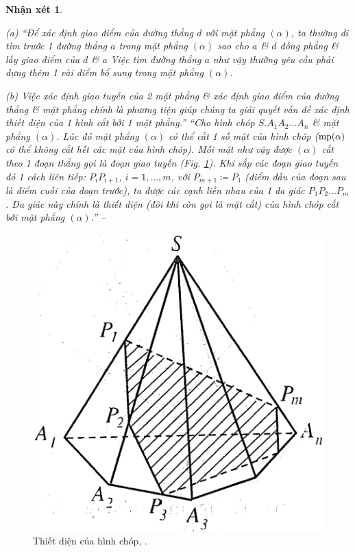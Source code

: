 \documentclass[oneside]{book}
\numberwithin{equation}{section}
\newtheorem{nhanxet}{Nhận xét}[section]
\begin{document}
\begin{nhanxet}
	\begin{enumerate*}
		\item[(a)] ``Để xác định giao điểm của đường thẳng $d$ với mặt phẳng $(\alpha)$, ta thường đi tìm trước 1 đường thẳng $a$ trong mặt phẳng $(\alpha)$ sao cho $a$ \& $d$ đồng phẳng \& lấy giao điểm của $d$ \& $a$ Việc tìm đường thẳng $a$ như vậy thường yêu cầu phải dựng thêm 1 vài điểm bổ sung trong mặt phẳng $(\alpha)$.
		\item[(b)] Việc xác định giao tuyến của 2 mặt phẳng \& xác định giao điểm của đường thẳng \& mặt phẳng chính là phương tiện giúp chúng ta giải quyết vấn đề xác định thiết diện của 1 hình cắt bởi 1 mặt phẳng.'' ``Cho hình chóp $S.A_1A_2\ldots A_n$ \& mặt phẳng $(\alpha)$. Lúc đó mặt phẳng $(\alpha)$ có thể cắt 1 số mặt của hình chóp (${\rm mp}(\alpha)$ có thể không cắt hết các mặt của hình chóp). Mỗi mặt như vậy được $(\alpha)$ cắt theo 1 đoạn thẳng gọi là \emph{đoạn giao tuyến} (Fig. \ref{fig:thiet_dien_hinh_chop}). Khi sắp các đoạn giao tuyến đó 1 cách liên tiếp: $P_iP_{i+1}$, $i = 1,\ldots,m$, với $P_{m+1}\coloneqq P_1$ (điểm đầu của đoạn sau là điểm cuối của đoạn trước), ta được các cạnh liền nhau của 1 đa giác $P_1P_2\ldots P_m$. Đa giác này chính là \emph{thiết diện} (đôi khi còn gọi là \emph{mặt cắt}) của hình chóp cắt bởi mặt phẳng $(\alpha)$.'' -- \cite[pp. 53--54]{TL_chuyen_Toan_Hinh_Hoc_11}
	\end{enumerate*}
\end{nhanxet}

\begin{figure}[H]
	\centering
	\includegraphics[scale=0.13]{thiet_dien_hinh_chop}
	\caption{Thiết diện của hình chóp, \cite[Hình 2.10, p. 53]{TL_chuyen_Toan_Hinh_Hoc_11}.}
	\label{fig:thiet_dien_hinh_chop}
\end{figure}
\end{document}
